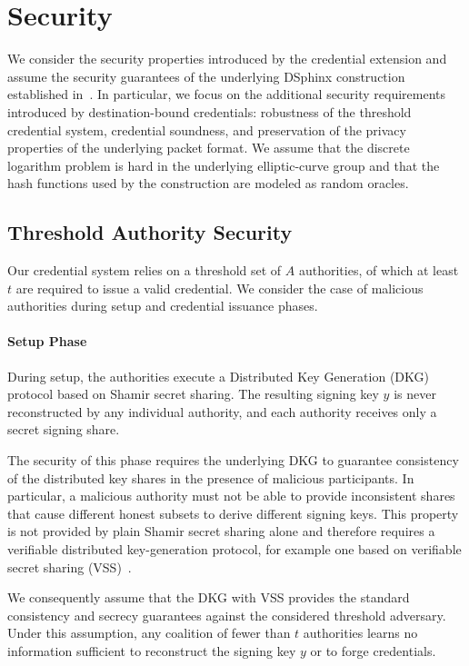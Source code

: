 \section{Security}

We consider the security properties introduced by the credential extension and assume the security guarantees of the underlying DSphinx construction established in~\cite{DSphinx}. 
In particular, we focus on the additional security requirements introduced by destination-bound credentials: robustness of the threshold credential system, credential soundness, and preservation of the privacy properties of the underlying packet format.
We assume that the discrete logarithm problem is hard in the underlying elliptic-curve group and that the hash functions used by the construction are modeled as random oracles. 

\subsection{Threshold Authority Security}

Our credential system relies on a threshold set of $A$ authorities, of which at least $t$ are required to issue a valid credential. 
We consider the case of malicious authorities during setup and credential issuance phases. 

\paragraph{Setup Phase}
During setup, the authorities execute a Distributed Key Generation (DKG) protocol based on Shamir secret sharing. 
The resulting signing key $y$ is never reconstructed by any individual authority, and each authority receives only a secret signing share.

The security of this phase requires the underlying DKG to guarantee consistency of the distributed key shares in the presence of malicious participants. 
In particular, a malicious authority must not be able to provide inconsistent shares that cause different honest subsets to derive different signing keys. 
This property is not provided by plain Shamir secret sharing alone and therefore requires a verifiable distributed key-generation protocol, 
for example one based on verifiable secret sharing (VSS)~\cite{VSS, FeldmanVSS, PedersenDKG}.

We consequently assume that the DKG with VSS provides the standard consistency and secrecy guarantees against the considered threshold adversary. 
Under this assumption, any coalition of fewer than $t$ authorities learns no information sufficient to reconstruct the signing key $y$ or to forge credentials.


